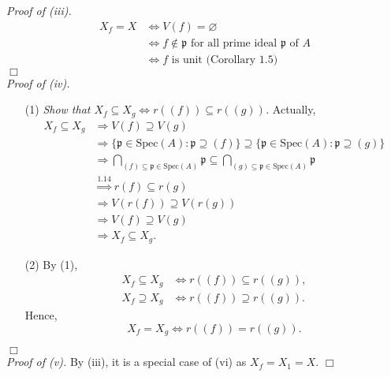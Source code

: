 \documentclass{article}
\begin{document}
\emph{Proof of (iii).}
\begin{align*}
X_f = X
&\Longleftrightarrow V(f) = \varnothing \\
&\Longleftrightarrow f \not\in \mathfrak{p}
\text{ for all prime ideal $\mathfrak{p}$ of $A$} \\
&\Longleftrightarrow f \text{ is unit (Corollary 1.5)}
\end{align*}
$\Box$ \\

\emph{Proof of (iv).}
\begin{enumerate}
\item[(1)]
\emph{Show that
$X_f \subseteq X_g \Longleftrightarrow r((f)) \subseteq r((g))$.}
Actually,
\begin{align*}
X_f \subseteq X_g
&\Longrightarrow V(f) \supseteq V(g) \\
&\Longrightarrow \{ \mathfrak{p} \in \text{Spec}(A) : \mathfrak{p} \supseteq (f) \}
  \supseteq \{ \mathfrak{p} \in \text{Spec}(A) : \mathfrak{p} \supseteq (g) \} \\
&\Longrightarrow \bigcap_{(f) \subseteq \mathfrak{p} \in \text{Spec}(A)} \mathfrak{p}
  \subseteq \bigcap_{(g) \subseteq \mathfrak{p} \in \text{Spec}(A)} \mathfrak{p}  \\
&\overset{1.14}{\Longrightarrow} r(f) \subseteq r(g) \\
&\Longrightarrow V(r(f)) \supseteq V(r(g)) \\
&\Longrightarrow V(f) \supseteq V(g) \\
&\Longrightarrow X_f \subseteq X_g.
\end{align*}
\item[(2)]
By (1),
\begin{align*}
X_f \subseteq X_g &\Longleftrightarrow r((f)) \subseteq r((g)), \\
X_f \supseteq X_g &\Longleftrightarrow r((f)) \supseteq r((g)).
\end{align*}
Hence,
$$X_f = X_g \Longleftrightarrow r((f)) = r((g)).$$
\end{enumerate}
$\Box$ \\

\emph{Proof of (v).}
By (iii), it is a special case of (vi) as $X_f = X_1 = X$.
$\Box$ \\
\end{document}
